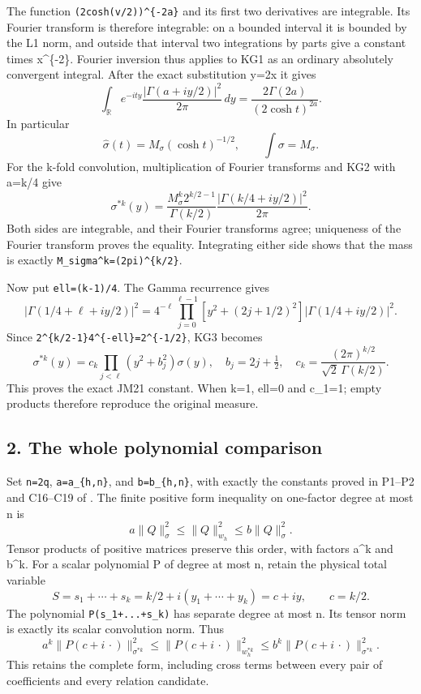 \documentclass[11pt]{article}
\begin{document}
The function \texttt{(2cosh(v/2))\^{}\{-2a\}} and its first two derivatives are integrable. Its Fourier transform is therefore integrable: on a bounded interval it is bounded by the L1 norm, and outside that interval two integrations by parts give a constant times \textbar x\textbar\^{}\{-2\}. Fourier inversion thus applies to KG1 as an ordinary absolutely convergent integral. After the exact substitution y=2x it gives \[
\int_{\mathbb R}e^{-ity}
\frac{|\Gamma(a+iy/2)|^2}{2\pi}\,dy
=\frac{2\Gamma(2a)}{(2\cosh t)^{2a}}.
\tag{KG2}
\] In particular \[
\widehat\sigma(t)=M_\sigma(\cosh t)^{-1/2},\qquad
\int\sigma=M_\sigma.
\] For the k-fold convolution, multiplication of Fourier transforms and KG2 with a=k/4 give \[
\sigma^{*k}(y)=
\frac{M_\sigma^k2^{k/2-1}}{\Gamma(k/2)}
\frac{|\Gamma(k/4+iy/2)|^2}{2\pi}.
\tag{KG3}
\] Both sides are integrable, and their Fourier transforms agree; uniqueness of the Fourier transform proves the equality. Integrating either side shows that the mass is exactly \texttt{M\_sigma\^{}k=(2pi)\^{}\{k/2\}}.

Now put \texttt{ell=(k-1)/4}. The Gamma recurrence gives \[
|\Gamma(1/4+\ell+iy/2)|^2
=4^{-\ell}\prod_{j=0}^{\ell-1}
 \left[y^2+(2j+1/2)^2\right]|\Gamma(1/4+iy/2)|^2.
\] Since \texttt{2\^{}\{k/2-1\}4\^{}\{-ell\}=2\^{}\{-1/2\}}, KG3 becomes \[
\boxed{\sigma^{*k}(y)=c_k\prod_{j<\ell}(y^2+b_j^2)\sigma(y),
\quad b_j=2j+\tfrac12,\quad
c_k=\frac{(2\pi)^{k/2}}{\sqrt2\,\Gamma(k/2)}.}
\tag{KG4}
\] This proves the exact JM21 constant. When k=1, ell=0 and c\_1=1; empty products therefore reproduce the original measure.

\subsection{2. The whole polynomial comparison}\label{the-whole-polynomial-comparison}

Set \texttt{n=2q}, \texttt{a=a\_\{h,n\}}, and \texttt{b=b\_\{h,n\}}, with exactly the constants proved in P1--P2 and C16--C19 of . The finite positive form inequality on one-factor degree at most n is \[
a\|Q\|_\sigma^2\le\|Q\|_{w_h}^2\le b\|Q\|_\sigma^2.
\] Tensor products of positive matrices preserve this order, with factors a\^{}k and b\^{}k. For a scalar polynomial P of degree at most n, retain the physical total variable \[
S=s_1+\cdots+s_k=k/2+i(y_1+\cdots+y_k)=c+iy,
\qquad c=k/2.
\] The polynomial \texttt{P(s\_1+...+s\_k)} has separate degree at most n. Its tensor norm is exactly its scalar convolution norm. Thus \[
a^k\|P(c+i\,\cdot)\|_{\sigma^{*k}}^2
\le\|P(c+i\,\cdot)\|_{w_h^{*k}}^2
\le b^k\|P(c+i\,\cdot)\|_{\sigma^{*k}}^2.
\tag{KG5}
\] This retains the complete form, including cross terms between every pair of coefficients and every relation candidate.
\end{document}
